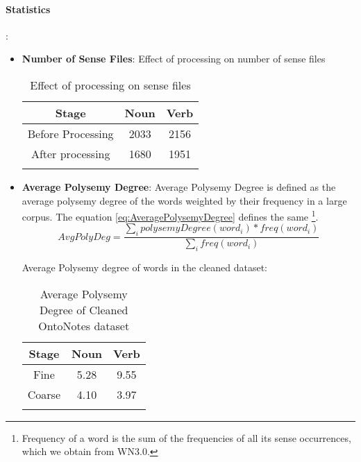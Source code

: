 \paragraph{Statistics}:
\begin{itemize}
\item \textbf{Number of Sense Files}: Effect of processing on number of sense files
\begin{center}
\begin{longtable}{| c | c | c |}  
\hline
    Stage & Noun & Verb \\ \hline
    Before Processing & 2033 & 2156 \\ \hline
    After processing & 1680 & 1951 \\ \hline
    \caption{Effect of processing on sense files}
\end{longtable}
\end{center}

\begin{comment}
\item \textbf{Distribution of Sense Files}: Distribution of sense files across WN Versions
\begin{center}
\begin{longtable}{| c | c | c |}  
    \hline
    WN Version & Noun & Verb \\ \hline
    2.0 & 216 & 0 \\ \hline
    2.1 & 866 & 928 \\ \hline
    3.0 & 598 & 1023 \\ \hline
\end{longtable}
\end{center}
\end{comment}

\item \textbf{Average Polysemy Degree}: Average Polysemy Degree is defined as the average polysemy degree of the words weighted by their frequency in a large corpus. The equation \ref{eq:AveragePolysemyDegree} defines the same \footnote{Frequency of a word is the sum of the frequencies of all its sense occurrences, which we obtain from WN3.0.}. 
\begin{equation}
\label{eq:AveragePolysemyDegree}
AvgPolyDeg = \frac{\sum_i polysemyDegree(word_i) * freq(word_i)}{\sum_i freq(word_i)} 
\end{equation}

Average Polysemy degree of words in the cleaned dataset: 
\begin{center}
\begin{longtable}{| c | c | c |}  
    \hline
    Stage & Noun & Verb \\ \hline
    Fine & 5.28 & 9.55 \\ \hline
    Coarse & 4.10 & 3.97 \\ \hline
    \caption{Average Polysemy Degree of Cleaned OntoNotes dataset}
\end{longtable}
\end{center}


\end{itemize}
